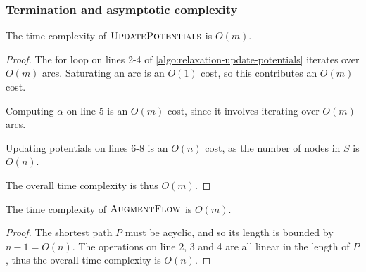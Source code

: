 \subsubsection{Termination and asymptotic complexity}

\begin{lemma} \label{lemma:relax-complexity-updatepotentials}
The time complexity of $\textproc{UpdatePotentials}$ is $O(m)$.
\end{lemma}
\begin{proof}
The for loop on lines 2-4 of \cref{algo:relaxation-update-potentials} iterates over $O(m)$ arcs. Saturating an arc is an $O(1)$ cost, so this contributes an $O(m)$ cost.

Computing $\alpha$ on line 5 is an $O(m)$ cost, since it involves iterating over $O(m)$ arcs.

Updating potentials on lines 6-8 is an $O(n)$ cost, as the number of nodes in $S$ is $O(n)$.

The overall time complexity is thus $O(m)$.
\end{proof}

\begin{lemma} \label{lemma:relax-complexity-augmentflow}
The time complexity of $\textproc{AugmentFlow}$ is $O(m)$.
\end{lemma}
\begin{proof}
The shortest path $P$ must be acyclic, and so its length is bounded by $n-1=O(n)$. The operations on line 2, 3 and 4 are all linear in the length of $P$, thus the overall time complexity is $O(n)$.
\end{proof}

